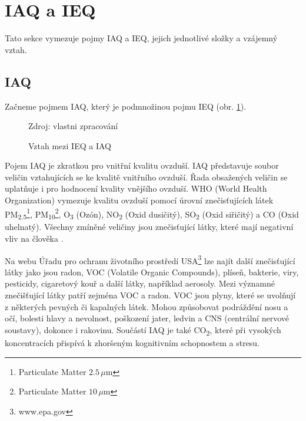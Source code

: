 \section{IAQ a IEQ}

Tato sekce vymezuje pojmy IAQ a IEQ, jejich jednotlivé složky a vzájemný vztah.

\FloatBarrier
\subsection{IAQ}
Začneme pojmem IAQ, který je podmnožinou pojmu IEQ (obr. \ref{obr:vztah_ieq_a_iaq}).

\begin{figure}[htbp!]
  \caption{Vztah mezi IEQ a IAQ}
	\label{obr:vztah_ieq_a_iaq}

	\centerfirst

\footnotesize Zdroj: vlastni zpracování
\end{figure}

Pojem IAQ je zkratkou pro vnitřní kvalitu ovzduší. IAQ představuje soubor veličin vztahujících se ke kvalitě vnitřního ovzduší. Řada obsažených veličin se uplatňuje i pro hodnocení kvality vnějšího ovzduší.
WHO (World Health Organization) vymezuje kvalitu ovzduší pomocí úrovní znečisťujících látek PM\textsubscript{2.5}\footnote{Particulate Matter $2.5\,\mu\text{m}$}, PM\textsubscript{10}\footnote{Particulate Matter $10\,\mu\text{m}$}, O\textsubscript{3} (Ozón), NO\textsubscript{2} (Oxid dusičitý), SO\textsubscript{2} (Oxid siřičitý) a CO (Oxid uhelnatý). Všechny zmíněné veličiny jsou znečisťující látky, které mají negativní vliv na člověka \parencite{worldhealthorganizationWHOGlobalAir2021}.

Na webu Úřadu pro ochranu životního prostředí USA\footnote{www.epa.gov} lze najít další znečisťující látky jako jsou radon, VOC (Volatile Organic Compounds), plíseň, bakterie, viry, pesticidy, cigaretový kouř a další látky, například aerosoly. Mezi významné znečišťující látky patří zejména VOC a radon. VOC jsou plyny, které se uvolňují z některých pevných či kapalných látek. Mohou způsobovat podráždění nosu a očí, bolesti hlavy a nevolnost, poškození jater, ledvin a CNS (centrální nervové soustavy), dokonce i rakovinu. \parencite{usepaIndoorPollutantsSources2015}
Součástí IAQ je také CO\textsubscript{2}, které při vysokých koncentracích přispívá k zhoršeným kognitivním schopnostem a stresu\parencite{dengImpactIndoorAir2024}.

